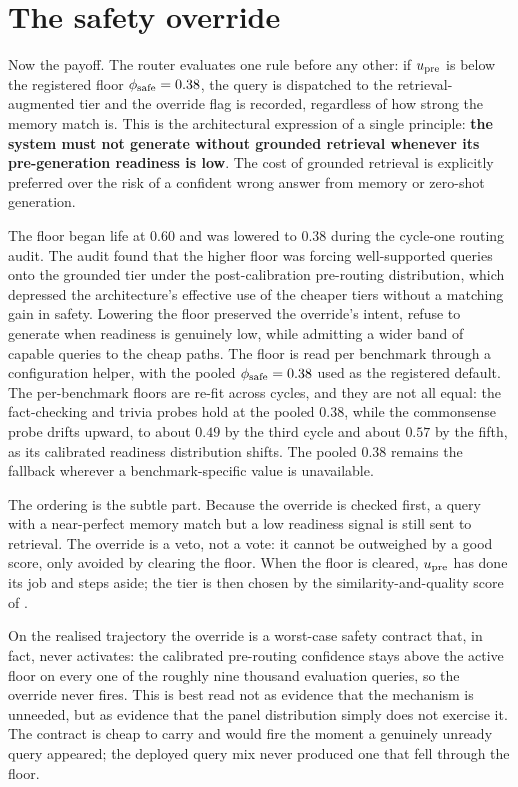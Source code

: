 \section{The safety override}
\label{sec:upre-override}

Now the payoff. The router evaluates one rule before any other: if $u_{\text{pre}}$ is
below the registered floor $\phi_{\text{safe}} = 0.38$, the query is dispatched to the
retrieval-augmented tier and the override flag is recorded, regardless of how
strong the memory match is. This is the architectural expression of a single
principle: \textbf{the system must not generate without grounded retrieval
whenever its pre-generation readiness is low}. The cost of grounded retrieval is
explicitly preferred over the risk of a confident wrong answer from memory or
zero-shot generation.

\begin{fromcode}
The floor began life at $0.60$ and was lowered to $0.38$ during the cycle-one
routing audit. The audit found that the higher floor was forcing well-supported
queries onto the grounded tier under the post-calibration pre-routing
distribution, which depressed the architecture's effective use of the cheaper
tiers without a matching gain in safety. Lowering the floor preserved the
override's intent, refuse to generate when readiness is genuinely low, while
admitting a wider band of capable queries to the cheap paths. The floor is read
per benchmark through a configuration helper, with the pooled $\phi_{\text{safe}} = 0.38$ used
as the registered default. The per-benchmark floors are re-fit across cycles, and
they are not all equal: the fact-checking and trivia probes hold at the pooled $0.38$,
while the commonsense probe drifts upward, to about $0.49$ by the third cycle and
about $0.57$ by the fifth, as its calibrated readiness distribution shifts. The pooled
$0.38$ remains the fallback wherever a benchmark-specific value is unavailable.
\end{fromcode}

The ordering is the subtle part. Because the override is checked first, a query
with a near-perfect memory match but a low readiness signal is still sent to
retrieval. The override is a veto, not a vote: it cannot be outweighed by a good
score, only avoided by clearing the floor. When the floor is cleared, $u_{\text{pre}}$ has
done its job and steps aside; the tier is then chosen by the similarity-and-quality
score of .

On the realised trajectory the override is a worst-case safety contract that, in
fact, never activates: the calibrated pre-routing confidence stays above the active
floor on every one of the roughly nine thousand evaluation queries, so the override
never fires. This is best read not as evidence that the mechanism is
unneeded, but as evidence that the panel distribution simply does not exercise it. The
contract is cheap to carry and would fire the moment a genuinely unready query
appeared; the deployed query mix never produced one that fell through the floor.

